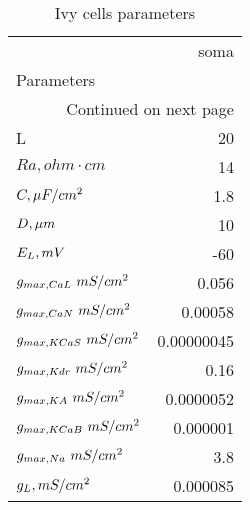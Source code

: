 \begin{longtable}{lr}
\caption{Ivy cells parameters}\label{ca1_ivy_cell_parameters}\\
\toprule
{} &       soma \\
Parameters         &            \\
\midrule
\endhead
\midrule
\multicolumn{2}{r}{{Continued on next page}} \\
\midrule
\endfoot

\bottomrule
\endlastfoot
L                  &         20 \\
$Ra,
 ohm \cdot cm$                 &         14 \\
$C, \linebreak \mu F / cm^2$                 &        1.8 \\
$D,\linebreak \mu m$               &         10 \\
$E_L, \linebreak mV$          &        -60 \\
$g_{max, CaL       }\linebreak \  mS / cm^2$&      0.056 \\
$g_{max, CaN       }\linebreak \  mS / cm^2$&    0.00058 \\
$g_{max, KCaS       }\linebreak \  mS / cm^2$& 0.00000045 \\
$g_{max, Kdr }\linebreak \  mS / cm^2$&       0.16 \\
$g_{max, KA     }\linebreak \  mS / cm^2$&  0.0000052 \\
$g_{max, KCaB      }\linebreak \  mS / cm^2$&   0.000001 \\
$g_{max, Na     }\linebreak \  mS / cm^2$&        3.8 \\
$g_L, \linebreak mS / cm^2$       &   0.000085 \\
\end{longtable}
